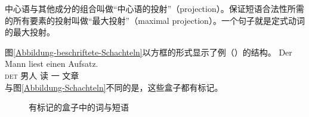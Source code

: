 中心语与其他成分的组合叫做“中心语的投射”（projection）。保证短语合法性所需的所有要素的投射叫做“最大投射”（maximal projection）。一个句子就是定式动词的最大投射。

图\vref{Abbildung-beschriftete-Schachteln}以方框的形式显示了例（）的结构。
\ea
\gll Der Mann liest einen Aufsatz.\\
	 \textsc{det}  男人 读 一 文章\\
\z
与图\ref{Abbildung-Schachteln}不同的是，这些盒子都有标记。
\begin{figure}
\centering
{}
\caption{\label{Abbildung-beschriftete-Schachteln}有标记的盒子中的词与短语}
\end{figure}%


